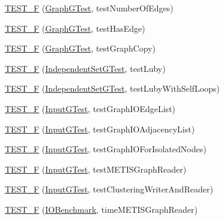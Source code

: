 \begin{DoxyCompactItemize}
\item 
\hyperlink{namespace_ensemble_clustering_a7817f932be536c9dc07afdc46dc57c54}{T\-E\-S\-T\-\_\-\-F} (\hyperlink{class_ensemble_clustering_1_1_graph_g_test}{Graph\-G\-Test}, test\-Number\-Of\-Edges)
\item 
\hyperlink{namespace_ensemble_clustering_a437aa26a275eef0373aca359ad0aa683}{T\-E\-S\-T\-\_\-\-F} (\hyperlink{class_ensemble_clustering_1_1_graph_g_test}{Graph\-G\-Test}, test\-Has\-Edge)
\item 
\hyperlink{namespace_ensemble_clustering_aae8e4ae0a3fad93c72c1c07d0cdbae04}{T\-E\-S\-T\-\_\-\-F} (\hyperlink{class_ensemble_clustering_1_1_graph_g_test}{Graph\-G\-Test}, test\-Graph\-Copy)
\item 
\hyperlink{namespace_ensemble_clustering_aafe378539841126e319ae9fefb991299}{T\-E\-S\-T\-\_\-\-F} (\hyperlink{class_ensemble_clustering_1_1_independent_set_g_test}{Independent\-Set\-G\-Test}, test\-Luby)
\item 
\hyperlink{namespace_ensemble_clustering_ad2edb150510359b83051b67c9e3cc91d}{T\-E\-S\-T\-\_\-\-F} (\hyperlink{class_ensemble_clustering_1_1_independent_set_g_test}{Independent\-Set\-G\-Test}, test\-Luby\-With\-Self\-Loops)
\item 
\hyperlink{namespace_ensemble_clustering_ae1a7d07b0387577abef0af1694157c13}{T\-E\-S\-T\-\_\-\-F} (\hyperlink{class_ensemble_clustering_1_1_input_g_test}{Input\-G\-Test}, test\-Graph\-I\-O\-Edge\-List)
\item 
\hyperlink{namespace_ensemble_clustering_ae523c7901a673937ed7a3717b07e02c6}{T\-E\-S\-T\-\_\-\-F} (\hyperlink{class_ensemble_clustering_1_1_input_g_test}{Input\-G\-Test}, test\-Graph\-I\-O\-Adjacency\-List)
\item 
\hyperlink{namespace_ensemble_clustering_aef2f33f80c6a62a7e6f5f7755baa8f9c}{T\-E\-S\-T\-\_\-\-F} (\hyperlink{class_ensemble_clustering_1_1_input_g_test}{Input\-G\-Test}, test\-Graph\-I\-O\-For\-Isolated\-Nodes)
\item 
\hyperlink{namespace_ensemble_clustering_a423d5b8c5b01890eb24f295015e0594b}{T\-E\-S\-T\-\_\-\-F} (\hyperlink{class_ensemble_clustering_1_1_input_g_test}{Input\-G\-Test}, test\-M\-E\-T\-I\-S\-Graph\-Reader)
\item 
\hyperlink{namespace_ensemble_clustering_a7d46a382b94e6bfd0f27d2cbbda829e9}{T\-E\-S\-T\-\_\-\-F} (\hyperlink{class_ensemble_clustering_1_1_input_g_test}{Input\-G\-Test}, test\-Clustering\-Writer\-And\-Reader)
\item 
\hyperlink{namespace_ensemble_clustering_af54348b97eb46defb247dffdf7011b82}{T\-E\-S\-T\-\_\-\-F} (\hyperlink{class_ensemble_clustering_1_1_i_o_benchmark}{I\-O\-Benchmark}, time\-M\-E\-T\-I\-S\-Graph\-Reader)

\end{DoxyCompactItemize}
